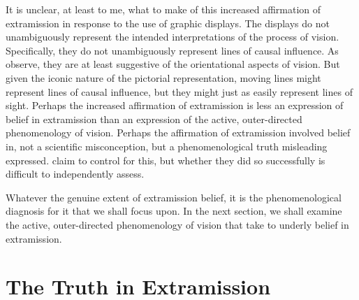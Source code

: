 It is unclear, at least to me, what to make of this increased affirmation of extramission in response to the use of graphic displays. The displays do not unambiguously represent the intended interpretations of the process of vision. Specifically, they do not unambiguously represent lines of causal influence. As \citet{Winer:1996as} observe, they are at least suggestive of the orientational aspects of vision. But given the iconic nature of the pictorial representation, moving lines might represent lines of causal influence, but they might just as easily represent lines of sight. Perhaps the increased affirmation of extramission is less an expression of belief in extramission than an expression of the active, outer-directed phenomenology of vision. Perhaps the affirmation of extramission involved belief in, not a scientific misconception, but a phenomenological truth misleading expressed. \citet{Winer:1996as} claim to control for this, but whether they did so successfully is difficult to independently assess.

Whatever the genuine extent of extramission belief, it is the phenomenological diagnosis for it that we shall focus upon. In the next section, we shall examine the active, outer-directed phenomenology of vision that \citet{Winer:1996as} take to underly belief in extramission.


\section{The Truth in Extramission} %
\label{sec:the_truth_in_extramission}



